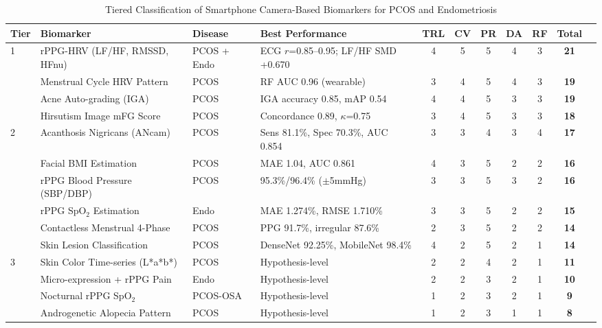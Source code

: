 \documentclass[conference]{IEEEtran}
\begin{document}
\begin{table}[t]
\centering
\caption{Tiered Classification of Smartphone Camera-Based Biomarkers for PCOS and Endometriosis}
\label{tab:tier}
\begin{tabular}{llllccccccc}
\toprule
\textbf{Tier} & \textbf{Biomarker} & \textbf{Disease} & \textbf{Best Performance} & \textbf{TRL} & \textbf{CV} & \textbf{PR} & \textbf{DA} & \textbf{RF} & \textbf{Total} \\
\midrule
\multirow{4}{*}{1} & rPPG-HRV (LF/HF, RMSSD, HFnu) & PCOS + Endo & ECG $r$=0.85--0.95; LF/HF SMD +0.670 & 4 & 5 & 5 & 4 & 3 & \textbf{21} \\
 & Menstrual Cycle HRV Pattern & PCOS & RF AUC 0.96 (wearable) & 3 & 4 & 5 & 4 & 3 & \textbf{19} \\
 & Acne Auto-grading (IGA) & PCOS & IGA accuracy 0.85, mAP 0.54 & 4 & 4 & 5 & 3 & 3 & \textbf{19} \\
 & Hirsutism Image mFG Score & PCOS & Concordance 0.89, $\kappa$=0.75 & 3 & 4 & 5 & 3 & 3 & \textbf{18} \\
\midrule
\multirow{6}{*}{2} & Acanthosis Nigricans (ANcam) & PCOS & Sens 81.1\%, Spec 70.3\%, AUC 0.854 & 3 & 3 & 4 & 3 & 4 & \textbf{17} \\
 & Facial BMI Estimation & PCOS & MAE 1.04, AUC 0.861 & 4 & 3 & 5 & 2 & 2 & \textbf{16} \\
 & rPPG Blood Pressure (SBP/DBP) & PCOS & 95.3\%/96.4\% ($\pm$5mmHg) & 3 & 3 & 5 & 3 & 2 & \textbf{16} \\
 & rPPG SpO$_2$ Estimation & Endo & MAE 1.274\%, RMSE 1.710\% & 3 & 3 & 5 & 2 & 2 & \textbf{15} \\
 & Contactless Menstrual 4-Phase & PCOS & PPG 91.7\%, irregular 87.6\% & 2 & 3 & 5 & 2 & 2 & \textbf{14} \\
 & Skin Lesion Classification & PCOS & DenseNet 92.25\%, MobileNet 98.4\% & 4 & 2 & 5 & 2 & 1 & \textbf{14} \\
\midrule
\multirow{4}{*}{3} & Skin Color Time-series (L*a*b*) & PCOS & Hypothesis-level & 2 & 2 & 4 & 2 & 1 & \textbf{11} \\
 & Micro-expression + rPPG Pain & Endo & Hypothesis-level & 2 & 2 & 3 & 2 & 1 & \textbf{10} \\
 & Nocturnal rPPG SpO$_2$ & PCOS-OSA & Hypothesis-level & 1 & 2 & 3 & 2 & 1 & \textbf{9} \\
 & Androgenetic Alopecia Pattern & PCOS & Hypothesis-level & 1 & 2 & 3 & 1 & 1 & \textbf{8} \\
\bottomrule
\end{tabular}
\end{table}
\end{document}
